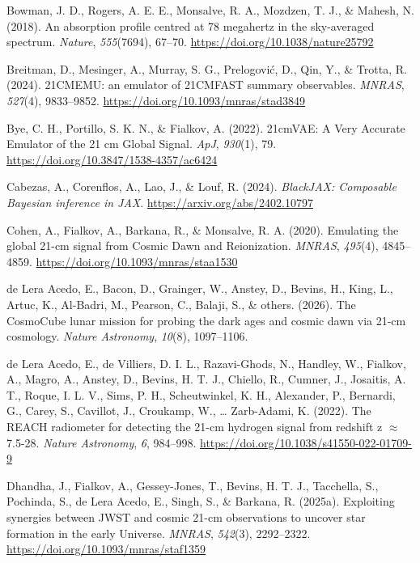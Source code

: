 \documentclass[
]{article}
\newlength{\cslhangindent}
\newenvironment{CSLReferences}[2] %
 {\begin{list}{}{%
  \setlength{\itemindent}{0pt}
  \setlength{\leftmargin}{0pt}
  \setlength{\parsep}{0pt}
  \ifodd #1
   \setlength{\leftmargin}{\cslhangindent}
   \setlength{\itemindent}{-1\cslhangindent}
  \fi
  \setlength{\itemsep}{#2\baselineskip}}}
 {\end{list}}
\begin{document}
\begin{CSLReferences}{1}{0}
Bowman, J. D., Rogers, A. E. E., Monsalve, R. A., Mozdzen, T. J., \&
Mahesh, N. (2018). {An absorption profile centred at 78 megahertz in the
sky-averaged spectrum}. \emph{Nature}, \emph{555}(7694), 67--70.
\url{https://doi.org/10.1038/nature25792}

Breitman, D., Mesinger, A., Murray, S. G., Prelogović, D., Qin, Y., \&
Trotta, R. (2024). {21CMEMU: an emulator of 21CMFAST summary
observables}. \emph{MNRAS}, \emph{527}(4), 9833--9852.
\url{https://doi.org/10.1093/mnras/stad3849}

Bye, C. H., Portillo, S. K. N., \& Fialkov, A. (2022). {21cmVAE: A Very
Accurate Emulator of the 21 cm Global Signal}. \emph{ApJ},
\emph{930}(1), 79. \url{https://doi.org/10.3847/1538-4357/ac6424}

Cabezas, A., Corenflos, A., Lao, J., \& Louf, R. (2024). \emph{BlackJAX:
Composable {B}ayesian inference in {JAX}}.
\url{https://arxiv.org/abs/2402.10797}

Cohen, A., Fialkov, A., Barkana, R., \& Monsalve, R. A. (2020).
{Emulating the global 21-cm signal from Cosmic Dawn and Reionization}.
\emph{MNRAS}, \emph{495}(4), 4845--4859.
\url{https://doi.org/10.1093/mnras/staa1530}

de Lera Acedo, E., Bacon, D., Grainger, W., Anstey, D., Bevins, H.,
King, L., Artuc, K., Al-Badri, M., Pearson, C., Balaji, S., \& others.
(2026). The CosmoCube lunar mission for probing the dark ages and cosmic
dawn via 21-cm cosmology. \emph{Nature Astronomy}, \emph{10}(8),
1097--1106.

de Lera Acedo, E., de Villiers, D. I. L., Razavi-Ghods, N., Handley, W.,
Fialkov, A., Magro, A., Anstey, D., Bevins, H. T. J., Chiello, R.,
Cumner, J., Josaitis, A. T., Roque, I. L. V., Sims, P. H., Scheutwinkel,
K. H., Alexander, P., Bernardi, G., Carey, S., Cavillot, J., Croukamp,
W., \ldots{} Zarb-Adami, K. (2022). {The REACH radiometer for detecting
the 21-cm hydrogen signal from redshift z {\(\approx\)} 7.5-28}.
\emph{Nature Astronomy}, \emph{6}, 984--998.
\url{https://doi.org/10.1038/s41550-022-01709-9}

Dhandha, J., Fialkov, A., Gessey-Jones, T., Bevins, H. T. J., Tacchella,
S., Pochinda, S., de Lera Acedo, E., Singh, S., \& Barkana, R. (2025a).
{Exploiting synergies between JWST and cosmic 21-cm observations to
uncover star formation in the early Universe}. \emph{MNRAS},
\emph{542}(3), 2292--2322. \url{https://doi.org/10.1093/mnras/staf1359}


\end{CSLReferences}
\end{document}
